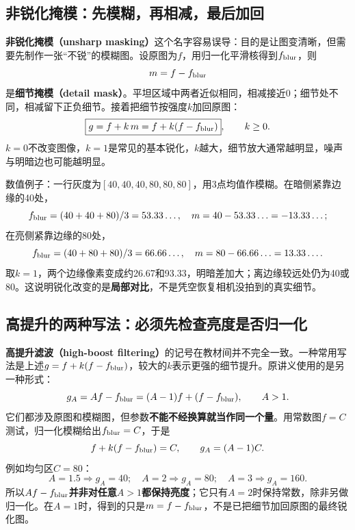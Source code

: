 \subsection{非锐化掩模：先模糊，再相减，最后加回}
\textbf{非锐化掩模（unsharp masking）}这个名字容易误导：目的是让图变清晰，但需要先制作一张“不锐”的模糊图。设原图为$f$，用归一化平滑核得到$f_{\rm blur}$，则
\[
 m=f-f_{\rm blur}
\]
是\textbf{细节掩模（detail mask）}。平坦区域中两者近似相同，相减接近0；细节处不同，相减留下正负细节。接着把细节按强度$k$加回原图：
\[
 \boxed{g=f+k\,m=f+k(f-f_{\rm blur})},\qquad k\ge0.
\]
$k=0$不改变图像，$k=1$是常见的基本锐化，$k$越大，细节放大通常越明显，噪声与明暗边也可能越明显。
\begin{center}
\end{center}
数值例子：一行灰度为$[40,40,40,80,80,80]$，用3点均值作模糊。在暗侧紧靠边缘的40处，
\[
 f_{\rm blur}=(40+40+80)/3=53.33\ldots,\quad
 m=40-53.33\ldots=-13.33\ldots;
\]
在亮侧紧靠边缘的80处，
\[
 f_{\rm blur}=(40+80+80)/3=66.66\ldots,\quad
 m=80-66.66\ldots=13.33\ldots.
\]
取$k=1$，两个边缘像素变成约26.67和93.33，明暗差加大；离边缘较远处仍为40或80。这说明锐化改变的是\textbf{局部对比}，不是凭空恢复相机没拍到的真实细节。

\subsection{高提升的两种写法：必须先检查亮度是否归一化}
\textbf{高提升滤波（high-boost filtering）}的记号在教材间并不完全一致。一种常用写法是上述$g=f+k(f-f_{\rm blur})$，较大的$k$表示更强的细节提升。原讲义使用的是另一种形式：
\[
 g_A=A f-f_{\rm blur}=(A-1)f+(f-f_{\rm blur}),\qquad A>1.
\]
它们都涉及原图和模糊图，但参数\textbf{不能不经换算就当作同一个量}。用常数图$f=C$测试，归一化模糊给出$f_{\rm blur}=C$，于是
\[
 f+k(f-f_{\rm blur})=C,\qquad g_A=(A-1)C.
\]
例如均匀区$C=80$：
\[
 A=1.5\Rightarrow g_A=40;\quad
 A=2\Rightarrow g_A=80;\quad
 A=3\Rightarrow g_A=160.
\]
所以\textbf{$Af-f_{\rm blur}$并非对任意$A>1$都保持亮度}；它只有$A=2$时保持常数，除非另做归一化。在$A=1$时，得到的只是$m=f-f_{\rm blur}$，不是已把细节加回原图的最终锐化图。

